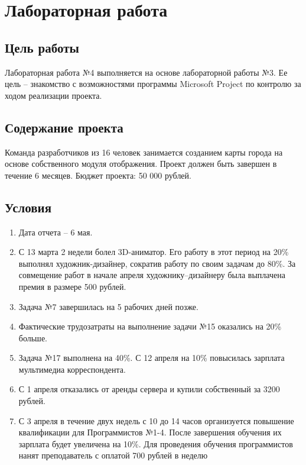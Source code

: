 \chapter{Лабораторная работа}

\section*{Цель работы}

Лабораторная работа №4 выполняется на основе лабораторной работы №3.
Ее цель -- знакомство с возможностями программы Microsoft Project по
контролю за ходом реализации проекта.

\section*{Содержание проекта}

Команда разработчиков из 16 человек занимается созданием карты города на основе собственного модуля отображения. Проект должен быть завершен в течение 6 месяцев. Бюджет проекта: 50 000 рублей.

\section*{Условия}

\begin{enumerate}
	\item Дата отчета -- 6 мая.
	\item С 13 марта 2 недели болел 3D-аниматор. Его работу в этот период на 20\% выполнял художник-дизайнер, сократив работу по своим задачам до 80\%. За совмещение работ в начале апреля художнику–дизайнеру была выплачена премия в размере 500 рублей.
	\item Задача №7 завершилась на 5 рабочих дней позже.
	\item Фактические трудозатраты на выполнение задачи №15 оказались на 20\% больше.
	\item Задача №17 выполнена на 40\%. С 12 апреля на 10\% повысилась зарплата мультимедиа корреспондента.
	\item С 1 апреля отказались от аренды сервера и купили собственный за 3200 рублей.
	\item С 3 апреля в течение двух недель с 10 до 14 часов организуется повышение квалификации для Программистов №1-4. После завершения обучения их зарплата будет увеличена на 10\%. Для проведения обучения программистов нанят преподаватель с оплатой 700 рублей в неделю
\end{enumerate}

